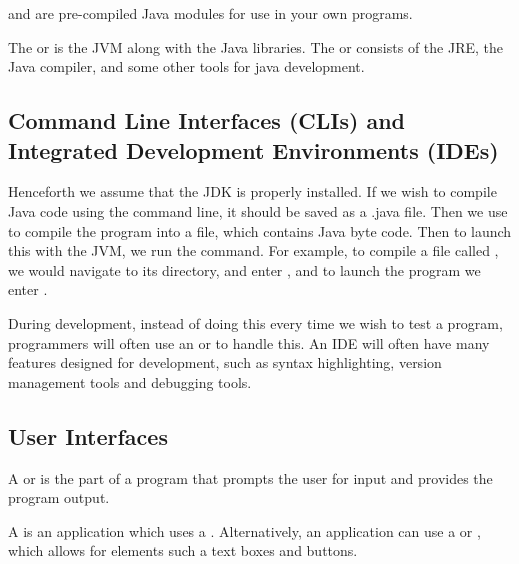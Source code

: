 \documentclass[11pt]{report}
\begin{document}
\begin{figure}[H]
\begin{subfigure}[t]{.5\textwidth}
{
        }
    \end{subfigure}
\end{figure}

\begin{defi}
     and  are pre-compiled Java modules for use in your own programs.
\end{defi}
The  or  is the JVM along with the Java libraries. The  or  consists of the JRE, the Java compiler, and some other tools for java development.

\subsection{Command Line Interfaces (CLIs) and Integrated Development Environments (IDEs)}
Henceforth we assume that the JDK is properly installed. If we wish to compile Java code using the command line, it should be saved as a .java file. Then we use  to compile the program into a  file, which contains Java byte code. Then to launch this with the JVM, we run the  command. For example, to compile a file called , we would navigate to its directory, and enter , and to launch the program we enter . 

\par During development, instead of doing this every time we wish to test a program, programmers will often use an  or  to handle this. An IDE will often have many features designed for development, such as syntax highlighting, version management tools and debugging tools.

\subsection{User Interfaces}
\begin{defi}
    A  or  is the part of a program that prompts the user for input and provides the program output. 
\end{defi}
 A  is an application which uses a . Alternatively, an application can use a  or , which allows for elements such a text boxes and buttons.
\end{document}
